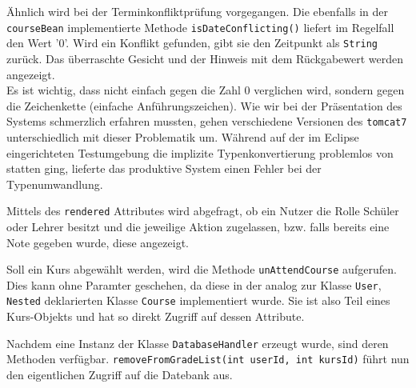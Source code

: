 Ähnlich wird bei der Terminkonfliktprüfung vorgegangen. Die ebenfalls in der \texttt{courseBean} implementierte Methode \texttt{isDateConflicting()} liefert im Regelfall den Wert '0'. Wird ein Konflikt gefunden, gibt sie den Zeitpunkt als \texttt{String} zurück. Das überraschte Gesicht und der Hinweis mit dem Rückgabewert werden angezeigt. 
\\ Es ist wichtig, dass nicht einfach gegen die Zahl 0 verglichen wird, sondern gegen die Zeichenkette (einfache Anführungszeichen). Wie wir bei der Präsentation des Systems schmerzlich erfahren mussten, gehen verschiedene Versionen des \texttt{tomcat7} unterschiedlich mit dieser Problematik um. Während auf der im Eclipse eingerichteten Testumgebung die implizite Typenkonvertierung problemlos von statten ging, lieferte das produktive System einen Fehler bei der Typenumwandlung.
		
	
Mittels des \texttt{rendered} Attributes wird abgefragt, ob ein Nutzer die Rolle Schüler oder Lehrer besitzt und die jeweilige Aktion zugelassen, bzw. falls bereits eine Note gegeben wurde, diese angezeigt. 
	
Soll ein Kurs abgewählt werden, wird die Methode \texttt{unAttendCourse} aufgerufen. Dies kann ohne Paramter geschehen, da diese in der analog zur Klasse \texttt{User}, \texttt{Nested}  deklarierten Klasse \texttt{Course} implementiert wurde. Sie ist also Teil eines Kurs-Objekts und hat so direkt Zugriff auf dessen Attribute. 
	
Nachdem eine Instanz der Klasse \texttt{DatabaseHandler} erzeugt wurde, sind deren Methoden verfügbar. \texttt{removeFromGradeList(int userId, int kursId)} führt nun den eigentlichen Zugriff auf die Datebank aus.	
		

